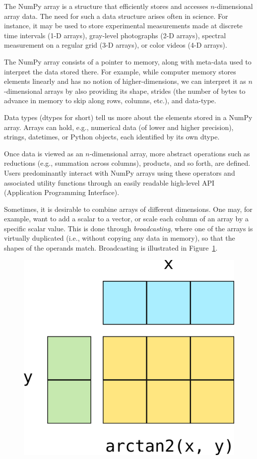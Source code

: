 The NumPy array is a structure that efficiently stores and accesses
$n$-dimensional array data\cite{vanderwalt2011numpy}.
The need for such a data structure arises often in science.
For instance, it may be used to store experimental measurements made at
discrete time intervals (1-D arrays), gray-level photographs (2-D arrays),
spectral measurement on a regular grid (3-D arrays), or color videos (4-D
arrays).

The NumPy array consists of a pointer to memory, along with meta-data used to
interpret the data stored there.
For example, while computer memory stores elements linearly and has no notion
of higher-dimensions, we can interpret it as $n$-dimensional arrays by also
providing its shape, strides (the number of bytes to advance in memory to skip
along rows, columns, etc.), and data-type.

Data types (dtypes for short) tell us more about the elements stored in a NumPy
array.
Arrays can hold, e.g., numerical data (of lower and higher precision), strings,
datetimes, or Python objects, each identified by its own dtype.

Once data is viewed as an $n$-dimensional array, more abstract operations such as
reductions (e.g., summation across columns), products, and so forth, are defined.
Users predominantly interact with NumPy arrays using these operators and
associated utility functions through an easily readable high-level API
(Application Programming Interface).

Sometimes, it is desirable to combine arrays of different dimensions.
One may, for example, want to add a scalar to a vector, or scale each column of
an array by a specific scalar value.
This is done through {\em broadcasting}, where one of the arrays is virtually
duplicated (i.e., without copying any data in memory), so that the shapes of
the operands match.
Broadcasting is illustrated in Figure~\ref{fig:broadcasting}.

\begin{figure}
  \centering
  \includegraphics[width=0.5\linewidth]{static/broadcasting}
  \caption{
   }
  \label{fig:broadcasting}
\end{figure}

